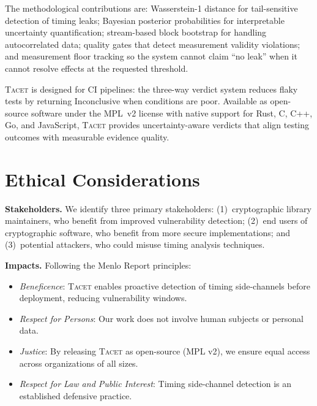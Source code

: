 \documentclass[letterpaper,twocolumn,10pt]{article}
\newcommand{\tacet}{\textsc{Tacet}\xspace}
\begin{document}
The methodological contributions are: Wasserstein-1 distance for tail-sensitive
detection of timing leaks; Bayesian posterior probabilities for interpretable
uncertainty quantification; stream-based block bootstrap for handling autocorrelated
data; quality gates that detect measurement validity violations; and measurement
floor tracking so the system cannot claim ``no leak'' when it cannot resolve
effects at the requested threshold.

\tacet is designed for CI pipelines: the three-way verdict system reduces
flaky tests by returning Inconclusive when conditions are poor. Available as open-source software under the MPL~v2
license with native support for Rust, C, C++, Go, and JavaScript, \tacet
provides uncertainty-aware verdicts that align testing outcomes with measurable
evidence quality.



\section*{Ethical Considerations}
\label{app:ethics}

\noindent\textbf{Stakeholders.}
We identify three primary stakeholders:
(1)~cryptographic library maintainers, who benefit from improved vulnerability detection;
(2)~end users of cryptographic software, who benefit from more secure implementations; and
(3)~potential attackers, who could misuse timing analysis techniques.

\smallskip
\noindent\textbf{Impacts.}
Following the Menlo Report principles:
\begin{itemize}[nosep,leftmargin=*]
    \item \emph{Beneficence}: \tacet enables proactive detection of timing
          side-channels before deployment, reducing vulnerability windows.
    \item \emph{Respect for Persons}: Our work does not involve human subjects
          or personal data.
    \item \emph{Justice}: By releasing \tacet as open-source (MPL v2), we ensure
          equal access across organizations of all sizes.
    \item \emph{Respect for Law and Public Interest}: Timing side-channel
          detection is an established defensive practice.
\end{itemize}
\end{document}
